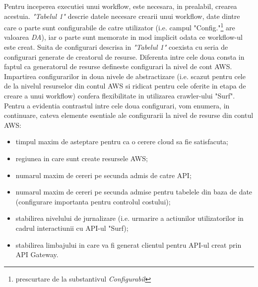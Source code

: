 Pentru inceperea executiei unui workflow, este necesara, in prealabil, crearea acestuia. \textit{"Tabelul 1"} descrie datele necesare crearii unui workflow, date dintre care o parte sunt configurabile de catre utilizator (i.e. campul "Config."\footnote{prescurtare de la substantivul \textit{Configurabil}} are valoarea \textit{DA}), iar o parte sunt memorate in mod implicit odata ce workflow-ul este creat. Suita de configurari descrisa in \textit{"Tabelul 1"} coexista cu seria de configurari generate de creatorul de resurse. Diferenta intre cele doua consta in faptul ca generatorul de resurse defineste configurari la nivel de cont AWS. Impartirea configurarilor in doua nivele de abstractizare (i.e. scazut pentru cele de la nivelul resurselor din contul AWS si ridicat pentru cele oferite in etapa de creare a unui workflow) confera flexibilitate in utilizarea crawler-ului "Surf". Pentru a evidentia contrastul intre cele doua configurari, vom enumera, in continuare, cateva elemente esentiale ale configurarii la nivel de resurse din contul AWS:

\begin{itemize}
	\item{timpul maxim de asteptare pentru ca o cerere cloud sa fie satisfacuta;}
	\item{regiunea in care sunt create resursele AWS;}
	\item{numarul maxim de cereri pe secunda admis de catre API;}
	\item{numarul maxim de cereri pe secunda admise pentru tabelele din baza de date (configurare importanta pentru controlul costului);}
	\item{stabilirea nivelului de jurnalizare (i.e. urmarire a actiunilor utilizatorilor in cadrul interactiunii cu API-ul "Surf);}
	\item{stabilirea limbajului in care va fi generat clientul pentru API-ul creat prin API Gateway.}

\end{itemize}

